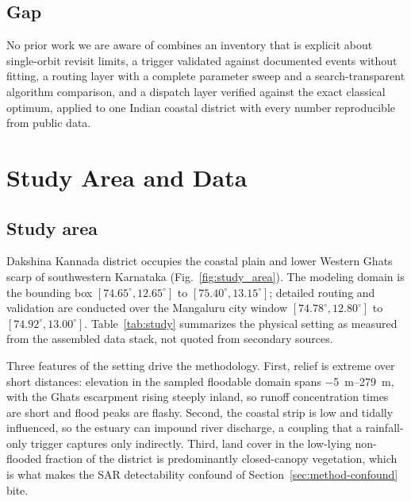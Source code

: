 \documentclass[10pt,twocolumn]{article}
\begin{document}
\subsection{Gap}
No prior work we are aware of combines an inventory that is explicit about
single-orbit revisit limits, a trigger validated against documented events
without fitting, a routing layer with a complete parameter sweep and a
search-transparent algorithm comparison, and a dispatch layer verified against
the exact classical optimum, applied to one Indian coastal district with every
number reproducible from public data.

\section{Study Area and Data}
\label{sec:study}

\subsection{Study area}
Dakshina Kannada district occupies the coastal plain and lower Western Ghats
scarp of southwestern Karnataka (Fig.~\ref{fig:study_area}). The modeling
domain is the bounding box $[74.65^\circ, 12.65^\circ]$ to
$[75.40^\circ, 13.15^\circ]$; detailed routing and validation are conducted over
the Mangaluru city window $[74.78^\circ, 12.80^\circ]$ to
$[74.92^\circ, 13.00^\circ]$. Table~\ref{tab:study} summarizes the physical
setting as measured from the assembled data stack, not quoted from
secondary sources.

Three features of the setting drive the methodology. First, relief is extreme
over short distances: elevation in the sampled floodable domain spans
\SIrange{-5}{279}{\metre}, with the Ghats escarpment rising steeply inland, so
runoff concentration times are short and flood peaks are flashy. Second, the
coastal strip is low and tidally influenced, so the estuary can impound river
discharge, a coupling that a rainfall-only trigger captures only indirectly.
Third, land cover in the low-lying non-flooded fraction of the district is
predominantly closed-canopy vegetation, which is what makes the SAR detectability
confound of Section~\ref{sec:method-confound} bite.
\end{document}
